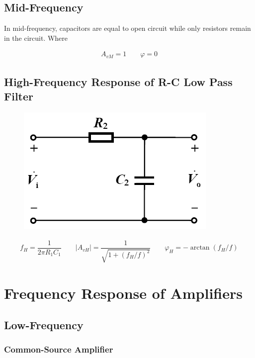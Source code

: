 \subsection{Mid-Frequency}

In mid-frequency, capacitors are equal to open circuit while only resistors remain in the circuit. Where

\begin{equation*}
  \begin{aligned}
    A_{vM} = 1 \quad\quad \varphi = 0
  \end{aligned}
\end{equation*}

\subsection{High-Frequency Response of R-C Low Pass Filter}

\begin{figure}[H]
  \centering
  \includegraphics[width=0.3\linewidth]{figures/R-C-Low}
\end{figure}

\begin{equation*}
  \begin{aligned}
    f_H = \dfrac{1}{2 \pi R_1 C_1} \quad\quad \left| A_{vH} \right| = \dfrac{1}{\sqrt{1 + \left( f_H / f \right)^2}} \quad\quad \varphi_H = - \arctan \left( f_H / f \right)
  \end{aligned}
\end{equation*}

\section{Frequency Response of Amplifiers}

\subsection{Low-Frequency}

\subsubsection{Common-Source Amplifier}

